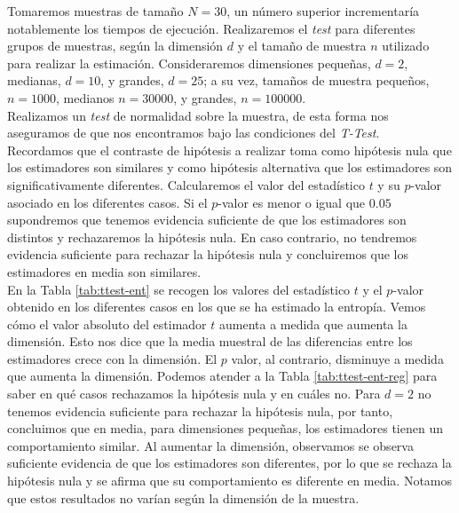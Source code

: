 \documentclass[12pt,a4paper]{report} %
\theoremstyle{definition}
\begin{document}
Tomaremos muestras de tamaño $N=30$, un número superior incrementaría notablemente los tiempos de ejecución. Realizaremos el \textit{test} para diferentes grupos de muestras, según la dimensión $d$ y el tamaño de muestra $n$ utilizado para realizar la estimación. Consideraremos dimensiones pequeñas, $d=2$, medianas, $d=10$, y grandes, $d=25$; a su vez, tamaños de muestra pequeños, $n=1000$, medianos $n=30000$, y grandes, $n=100000$.\\

Realizamos un \textit{test} de normalidad sobre la muestra, de esta forma nos aseguramos de que nos encontramos bajo las condiciones del \textit{T-Test}.\\

Recordamos que el contraste de hipótesis a realizar toma como hipótesis nula que los estimadores son similares y como hipótesis alternativa que los estimadores son significativamente diferentes. Calcularemos el valor del estadístico $t$ y su $p$-valor asociado en los diferentes casos. Si el $p$-valor es menor o igual que $0.05$ supondremos que tenemos evidencia suficiente de que los estimadores son distintos y rechazaremos la hipótesis nula. En caso contrario, no tendremos evidencia suficiente para rechazar la hipótesis nula y concluiremos que los estimadores en media son similares.\\

En la Tabla \ref{tab:ttest-ent} se recogen los valores del estadístico $t$ y el $p$-valor obtenido en los diferentes casos en los que se ha estimado la entropía. Vemos cómo el valor absoluto del estimador $t$ aumenta a medida que aumenta la dimensión. Esto nos dice que la media muestral de las diferencias entre los estimadores crece con la dimensión. El $p$ valor, al contrario, disminuye a medida que aumenta la dimensión. Podemos atender a la Tabla \ref{tab:ttest-ent-reg} para saber en qué casos rechazamos la hipótesis nula y en cuáles no. Para $d=2$ no tenemos evidencia suficiente para rechazar la hipótesis nula, por tanto, concluimos que en media, para dimensiones pequeñas, los estimadores tienen un comportamiento similar. Al aumentar la dimensión, observamos se observa suficiente evidencia de que los estimadores son diferentes, por lo que se rechaza la hipótesis nula y se afirma que su comportamiento es diferente en media. Notamos que estos resultados no varían según la dimensión de la muestra.\\
\end{document}
